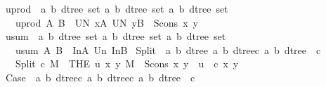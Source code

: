 \begin{isabellebody}
\ uprod\ {\isacharcolon}{\isacharcolon}\ {\isachardoublequoteopen}{\isacharbrackleft}{\isacharparenleft}{\isacharprime}a{\isacharcomma}\ {\isacharprime}b{\isacharparenright}\ dtree\ set{\isacharcomma}\ {\isacharparenleft}{\isacharprime}a{\isacharcomma}\ {\isacharprime}b{\isacharparenright}\ dtree\ set{\isacharbrackright}{\isacharequal}{\isachargreater}\ {\isacharparenleft}{\isacharprime}a{\isacharcomma}\ {\isacharprime}b{\isacharparenright}\ dtree\ set{\isachardoublequoteclose}\isanewline
\ \ \ {\isachardoublequoteopen}uprod\ A\ B\ {\isacharequal}{\isacharequal}\ UN\ x{\isacharcolon}A{\isachardot}\ UN\ y{\isacharcolon}B{\isachardot}\ {\isacharbraceleft}\ Scons\ x\ y\ {\isacharbraceright}{\isachardoublequoteclose}\isanewline
{}\isamarkupfalse%
\ usum\ {\isacharcolon}{\isacharcolon}\ {\isachardoublequoteopen}{\isacharbrackleft}{\isacharparenleft}{\isacharprime}a{\isacharcomma}\ {\isacharprime}b{\isacharparenright}\ dtree\ set{\isacharcomma}\ {\isacharparenleft}{\isacharprime}a{\isacharcomma}\ {\isacharprime}b{\isacharparenright}\ dtree\ set{\isacharbrackright}{\isacharequal}{\isachargreater}\ {\isacharparenleft}{\isacharprime}a{\isacharcomma}\ {\isacharprime}b{\isacharparenright}\ dtree\ set{\isachardoublequoteclose}\isanewline
\ \ \ {\isachardoublequoteopen}usum\ A\ B\ {\isacharequal}{\isacharequal}\ In{}{\isacharbackquote}A\ Un\ In{}{\isacharbackquote}B{\isachardoublequoteclose}\isanewline
\isanewline
\isanewline
{}\isamarkupfalse%
\ Split\ {\isacharcolon}{\isacharcolon}\ {\isachardoublequoteopen}{\isacharbrackleft}{\isacharbrackleft}{\isacharparenleft}{\isacharprime}a{\isacharcomma}\ {\isacharprime}b{\isacharparenright}\ dtree{\isacharcomma}\ {\isacharparenleft}{\isacharprime}a{\isacharcomma}\ {\isacharprime}b{\isacharparenright}\ dtree{\isacharbrackright}{\isacharequal}{\isachargreater}{\isacharprime}c{\isacharcomma}\ {\isacharparenleft}{\isacharprime}a{\isacharcomma}\ {\isacharprime}b{\isacharparenright}\ dtree{\isacharbrackright}\ {\isacharequal}{\isachargreater}\ {\isacharprime}c{\isachardoublequoteclose}\isanewline
\ \ \ {\isachardoublequoteopen}Split\ c\ M\ {\isacharequal}{\isacharequal}\ THE\ u{\isachardot}\ {\isasymexists}x\ y{\isachardot}\ M\ {\isacharequal}\ Scons\ x\ y\ {\isasymand}\ u\ {\isacharequal}\ c\ x\ y{\isachardoublequoteclose}\isanewline
\isanewline
{}\isamarkupfalse%
\ Case\ {\isacharcolon}{\isacharcolon}\ {\isachardoublequoteopen}{\isacharbrackleft}{\isacharbrackleft}{\isacharparenleft}{\isacharprime}a{\isacharcomma}\ {\isacharprime}b{\isacharparenright}\ dtree{\isacharbrackright}{\isacharequal}{\isachargreater}{\isacharprime}c{\isacharcomma}\ {\isacharbrackleft}{\isacharparenleft}{\isacharprime}a{\isacharcomma}\ {\isacharprime}b{\isacharparenright}\ dtree{\isacharbrackright}{\isacharequal}{\isachargreater}{\isacharprime}c{\isacharcomma}\ {\isacharparenleft}{\isacharprime}a{\isacharcomma}\ {\isacharprime}b{\isacharparenright}\ dtree{\isacharbrackright}\ {\isacharequal}{\isachargreater}\ {\isacharprime}c{\isachardoublequoteclose}\isanewline

\end{isabellebody}
